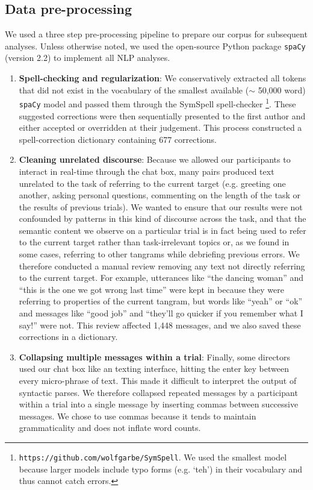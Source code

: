 \documentclass[alpha-refs]{wiley-article}
\begin{document}
\subsection{Data pre-processing}

We used a three step pre-processing pipeline to prepare our corpus for subsequent analyses. Unless otherwise noted, we used the open-source Python package \texttt{spaCy} (version 2.2) to implement all NLP analyses. 

\begin{enumerate}

\item \textbf{Spell-checking and regularization}: We conservatively extracted all tokens that did not exist in the vocabulary of the smallest available ($\sim$ 50,000 word) \texttt{spaCy} model and passed them through the SymSpell spell-checker \footnote{\texttt{https://github.com/wolfgarbe/SymSpell}. We used the smallest model because larger models include typo forms (e.g. `teh') in their vocabulary and thus cannot catch errors.}. These suggested corrections were then sequentially presented to the first author and either accepted or overridden at their judgement. This process constructed a spell-correction dictionary containing 677 corrections. 

\item \textbf{Cleaning unrelated discourse}: Because we allowed our participants to interact in real-time through the chat box, many pairs produced text unrelated to the task of referring to the current target (e.g. greeting one another, asking personal questions, commenting on the length of the task or the results of previous trials). We wanted to ensure that our results were not confounded by patterns in this kind of discourse across the task, and that the semantic content we observe on a particular trial is in fact being used to refer to the current target rather than task-irrelevant topics or, as we found in some cases, referring to other tangrams while debriefing previous errors. We therefore conducted a manual review removing any text not directly referring to the current target. For example, utterances like ``the dancing woman'' and ``this is the one we got wrong last time'' were kept in because they were referring to properties of the current tangram, but words like ``yeah'' or ``ok'' and messages like ``good job'' and ``they'll go quicker if you remember what I say!'' were not. This review affected 1,448 messages, and we also saved these corrections in a dictionary. 

\item \textbf{Collapsing multiple messages within a trial}: Finally, some directors used our chat box like an texting interface, hitting the enter key between every micro-phrase of text. This made it difficult to interpret the output of syntactic parses. We therefore collapsed repeated messages by a participant within a trial into a single message by inserting commas between successive messages. We chose to use commas because it tends to maintain grammaticality and does not inflate word counts.

\end{enumerate}
\end{document}
